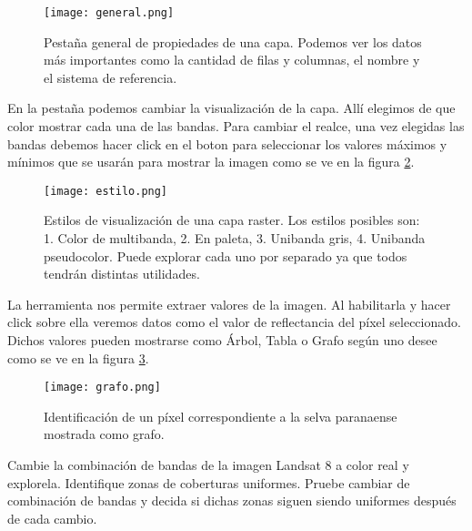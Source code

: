 \begin{figure}[h!]
\begin{center}
    \texttt{[image: general.png]}
\end{center}
\caption{Pestaña general de propiedades de una capa. Podemos ver
    los datos m\'as importantes como la cantidad de filas y
    columnas, el nombre y el sistema de referencia.}
\label{fig:general}
\end{figure}

En la pestaña  podemos cambiar la visualizaci\'on de
la capa. All\'i elegimos de que color mostrar cada una de las
bandas. Para cambiar el realce, una vez elegidas las bandas debemos hacer
click en el boton  para seleccionar los valores m\'aximos y m\'inimos
que se usar\'an para mostrar la imagen como se ve en la figura \ref{fig:estilo}.

\begin{figure}[h!]
\begin{center}
    \texttt{[image: estilo.png]}
\end{center}
\caption{Estilos de visualizaci\'on de una capa raster. Los estilos posibles son:
    1. Color de multibanda, 2. En paleta, 3. Unibanda gris, 4. Unibanda
    pseudocolor. Puede explorar cada uno por separado ya que todos tendr\'an
    distintas utilidades.}
\label{fig:estilo}
\end{figure}

La herramienta  nos permite extraer valores
de la imagen. Al habilitarla y hacer click sobre ella veremos datos como el valor
de reflectancia del p\'ixel seleccionado. Dichos valores pueden mostrarse como
\'Arbol, Tabla o Grafo seg\'un uno desee como se ve en la figura \ref{fig:grafo}.

\begin{figure}[h!]
\begin{center}
    \texttt{[image: grafo.png]}
\end{center}
\caption{Identificaci\'on de un p\'ixel correspondiente a la selva paranaense
    mostrada como grafo. }
\label{fig:grafo}
\end{figure}

\begin{act}
    Cambie la combinación de bandas de la imagen Landsat 8 a color real y explorela.
    Identifique zonas de coberturas uniformes. Pruebe cambiar de
    combinaci\'on de bandas y decida si dichas zonas siguen siendo uniformes
    despu\'es de cada cambio.
\end{act}

